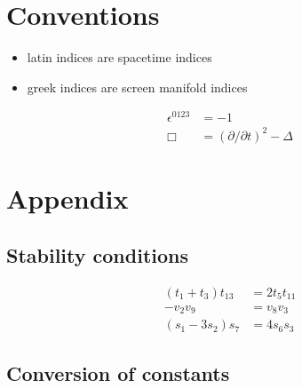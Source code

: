 \documentclass[11pt]{article}
\begin{document}
\section{Conventions}

\begin{itemize}
	\item latin indices are spacetime indices
	\item greek indices are screen manifold indices
\end{itemize}

\begin{align} \label{conv_eps}
	\epsilon^{0 1 2 3} &=  - 1\\
	\Box &= \left( \partial / \partial t \right)^2 -  \Delta
\end{align}

\section{Appendix} \label{sec_appen}

\subsection{Stability conditions}

\begin{align}
	\left(t_1 + t_3 \right) t_13 &= 2 t_5 t_11\\
	- v_2 v_9 &= v_8 v_3 \\
	\left( s_1 - 3 s_2 \right) s_7 &= 4 s_6 s_3
\end{align}

\subsection{Conversion of constants}
\end{document}

